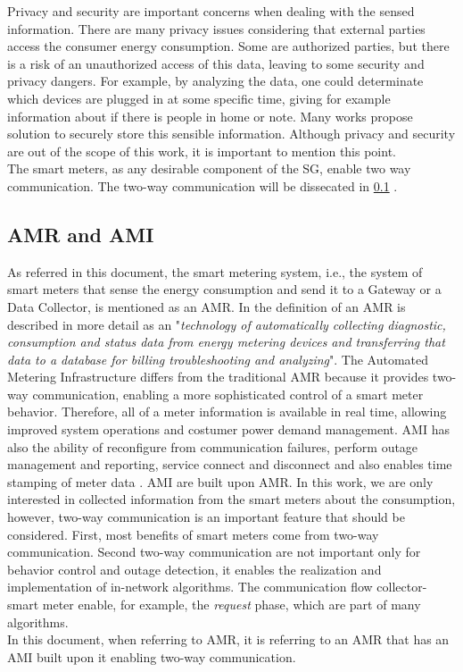 Privacy and security are important concerns when dealing with the sensed information. There are many privacy issues considering that external parties access the consumer energy consumption. Some are authorized parties, but there is a risk of an unauthorized access of this data, leaving to some security and privacy dangers. For example, by analyzing the data, one could determinate which devices are plugged in at some specific time, giving for example information about if there is people in home or note. Many works propose solution to securely store this sensible information. Although privacy and security are out of the scope of this work, it is important to mention this point.\\
The smart meters, as any desirable component of the SG, enable two way communication. The two-way communication will be dissecated in \ref{subsec:amrami} .

\subsection{AMR and AMI}\label{subsec:amrami}
As referred in this document, the smart metering system, i.e., the system of smart meters that sense the energy consumption and send it to a Gateway or a Data Collector, is mentioned as an AMR. In \cite{journals/spm/ErkinTLP13} the definition of an AMR is described in more detail as an "\textit{technology of automatically collecting diagnostic, consumption and status data from energy metering devices and transferring that data to a database for billing troubleshooting and analyzing}".
The Automated Metering Infrastructure  differs from the traditional AMR because it provides two-way communication, enabling a more sophisticated control of a smart meter behavior. Therefore, all of a meter information is available in real time, allowing improved system operations and  costumer power demand management\cite{journals/spm/ErkinTLP13}.  AMI has also the ability of reconfigure from communication failures, perform outage management and reporting, service connect and disconnect and also enables time stamping of meter data \cite{hart2008using}. AMI are built upon AMR. 
In this work, we are only interested in collected information from the smart meters about the consumption, however, two-way communication is an important feature that should be considered. First, most benefits of smart meters come from two-way communication. Second two-way communication are not important only for behavior control and outage detection, it enables the realization and implementation of in-network algorithms. The communication flow collector-smart meter enable, for example, the \textit{request} phase, which are part of many algorithms.\\
In this document, when referring to AMR, it is referring to an AMR that has an AMI built upon it enabling two-way communication. 
